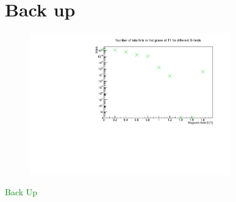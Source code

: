 \section{Back up}
\appendix

\begin{frame}
  \begin{figure}
    \centering
    \includegraphics[width=0.78\textwidth]{fig/hits_bfield.pdf}
  \end{figure}
\end{frame}

\begin{frame}[t]{}
  \centering
  \textcolor{green}{\Huge{Back Up}}
\end{frame}


